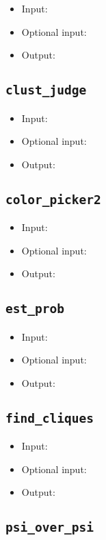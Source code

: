 \documentclass[10pt]{article}
\theoremstyle{definition}
\numberwithin{theorem}{section}
\numberwithin{definition}{section}
\numberwithin{lemma}{section}
\numberwithin{corollary}{section}
\numberwithin{clm}{section}
\numberwithin{rmk}{section}
\begin{document}
\begin{itemize}
	\item Input: 
	\item Optional input:
	\item Output: 
\end{itemize}

\cprotect \subsection{\verb|clust_judge|}

\begin{itemize}
	\item Input: 
	\item Optional input:
	\item Output: 
\end{itemize}

\cprotect \subsection{\verb|color_picker2|}

\begin{itemize}
	\item Input: 
	\item Optional input:
	\item Output: 
\end{itemize}

\cprotect \subsection{\verb|est_prob|}

\begin{itemize}
	\item Input: 
	\item Optional input:
	\item Output: 
\end{itemize}

\cprotect \subsection{\verb|find_cliques|}

\begin{itemize}
	\item Input: 
	\item Optional input:
	\item Output: 
\end{itemize}

\cprotect \subsection{\verb|psi_over_psi|}
\end{document}
